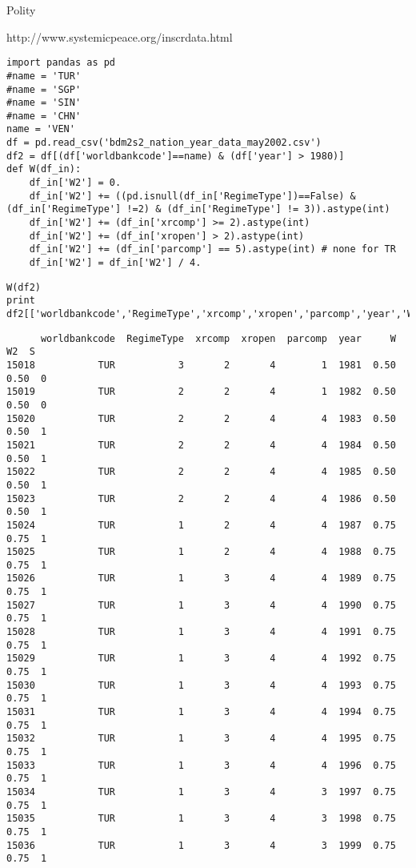 \documentclass[12pt,fleqn]{article}\usepackage{common}
\begin{document}
Polity

http://www.systemicpeace.org/inscrdata.html

\begin{verbatim}
import pandas as pd
#name = 'TUR'
#name = 'SGP'
#name = 'SIN'
#name = 'CHN'
name = 'VEN'
df = pd.read_csv('bdm2s2_nation_year_data_may2002.csv')
df2 = df[(df['worldbankcode']==name) & (df['year'] > 1980)]
def W(df_in):
    df_in['W2'] = 0.
    df_in['W2'] += ((pd.isnull(df_in['RegimeType'])==False) & (df_in['RegimeType'] !=2) & (df_in['RegimeType'] != 3)).astype(int)
    df_in['W2'] += (df_in['xrcomp'] >= 2).astype(int)
    df_in['W2'] += (df_in['xropen'] > 2).astype(int)
    df_in['W2'] += (df_in['parcomp'] == 5).astype(int) # none for TR
    df_in['W2'] = df_in['W2'] / 4.
\end{verbatim}

\begin{verbatim}
W(df2)
print df2[['worldbankcode','RegimeType','xrcomp','xropen','parcomp','year','W','W2','S']]
\end{verbatim}

\begin{verbatim}
      worldbankcode  RegimeType  xrcomp  xropen  parcomp  year     W    W2  S
15018           TUR           3       2       4        1  1981  0.50  0.50  0
15019           TUR           2       2       4        1  1982  0.50  0.50  0
15020           TUR           2       2       4        4  1983  0.50  0.50  1
15021           TUR           2       2       4        4  1984  0.50  0.50  1
15022           TUR           2       2       4        4  1985  0.50  0.50  1
15023           TUR           2       2       4        4  1986  0.50  0.50  1
15024           TUR           1       2       4        4  1987  0.75  0.75  1
15025           TUR           1       2       4        4  1988  0.75  0.75  1
15026           TUR           1       3       4        4  1989  0.75  0.75  1
15027           TUR           1       3       4        4  1990  0.75  0.75  1
15028           TUR           1       3       4        4  1991  0.75  0.75  1
15029           TUR           1       3       4        4  1992  0.75  0.75  1
15030           TUR           1       3       4        4  1993  0.75  0.75  1
15031           TUR           1       3       4        4  1994  0.75  0.75  1
15032           TUR           1       3       4        4  1995  0.75  0.75  1
15033           TUR           1       3       4        4  1996  0.75  0.75  1
15034           TUR           1       3       4        3  1997  0.75  0.75  1
15035           TUR           1       3       4        3  1998  0.75  0.75  1
15036           TUR           1       3       4        3  1999  0.75  0.75  1
\end{verbatim}
\end{document}
